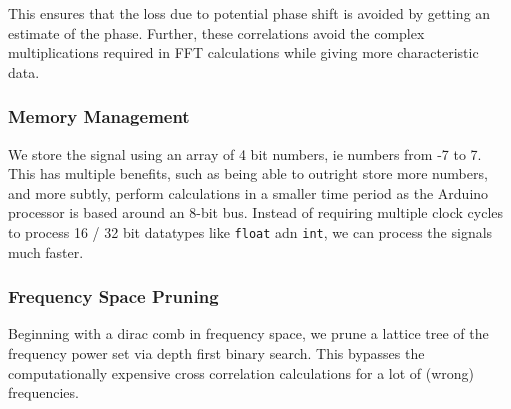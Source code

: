 This ensures that the loss due to potential phase shift is avoided by getting an
estimate of the phase. Further, these correlations avoid the complex
multiplications required in FFT calculations while giving more characteristic
data. 

\subsubsection{Memory Management}
We store the signal using an array of 4 bit numbers, ie numbers from -7 to 7.
This has multiple benefits, such as being able to outright store more numbers,
and more subtly, perform calculations in a smaller time period as the Arduino
processor is based around an 8-bit bus. Instead of requiring multiple clock
cycles to process 16 / 32 bit datatypes like \texttt{float} adn \texttt{int}, we
can process the signals much faster.

\subsubsection{Frequency Space Pruning}
Beginning with a dirac comb in frequency space, we prune a lattice tree of the
frequency power set via depth first binary search. This bypasses the
computationally expensive cross correlation calculations for a lot of (wrong)
frequencies. 